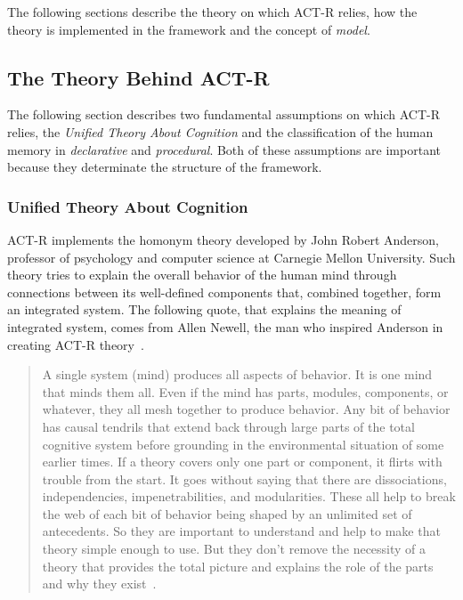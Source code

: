 	The following sections describe the theory on which ACT-R relies, how the theory is implemented in the framework and the concept of \emph{model}.  

	
	
	\subsection{The Theory Behind ACT-R}
		The following section describes two fundamental assumptions on which ACT-R relies, the \emph{Unified Theory About Cognition} and the classification of the human memory in \emph{declarative} and \emph{procedural}. Both of these assumptions are important because they determinate the structure of the framework.
		
		\subsubsection{Unified Theory About Cognition}
		\mbox{ACT-R} implements the homonym theory developed by John Robert Anderson, professor of psychology and computer science at Carnegie Mellon University. Such theory tries to explain the overall behavior of the human mind through connections between its well-defined components that, combined together, form an integrated system. The following quote, that explains the meaning of integrated system, comes from Allen Newell, the man who inspired Anderson in creating ACT-R theory~\cite{Anderson04anintegrated}.

		\begin{quote}
		A single system (mind) produces all aspects of behavior. It is one mind that minds them all. Even if the mind has parts, modules, components, or whatever, they all mesh together to produce behavior. Any bit of behavior has causal tendrils that extend back through large parts of the total cognitive system before grounding in the environmental situation of some earlier times. If a theory covers only one part or component, it flirts with trouble from the start. It goes without saying that there are dissociations, independencies, impenetrabilities, and modularities. These all help to break the web of each bit of behavior being shaped by an unlimited set of antecedents. So they are important to understand and help to make that theory simple enough to use. But they don’t remove the necessity of a theory that provides the total picture and explains the role of the parts and why they exist~\cite[p.17-18]{newell1994unified}.
		\end{quote}

